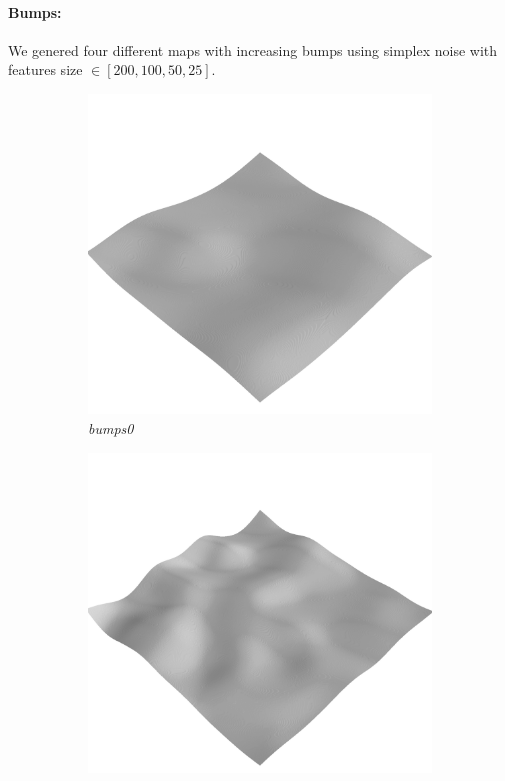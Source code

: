 \documentclass[../document.tex]{subfiles}
\begin{document}
\paragraph{Bumps:} 
We genered four different maps with increasing bumps using simplex noise with features size $\in[200,100,50,25 ]$. 
\begin{figure}[H]
    \centering
        \begin{subfigure}[b]{0.32\textwidth}
            \includegraphics[width=\textwidth]{../img/hm3d/bumps0.png}
            \caption{\emph{bumps0}}
        \end{subfigure}
        \begin{subfigure}[b]{0.32\linewidth}
            \includegraphics[width=\textwidth]{../img/hm3d/bumps1.png}

\end{subfigure}
\end{figure}
\end{document}
